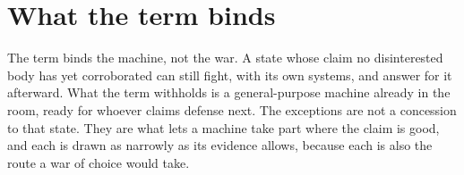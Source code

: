 \section{What the term binds}
\label{sec:6.9}
The term binds the machine, not the war. A state whose claim no disinterested body has yet corroborated can still fight, with its own systems, and answer for it afterward. What the term withholds is a general-purpose machine already in the room, ready for whoever claims defense next. The exceptions are not a concession to that state. They are what lets a machine take part where the claim is good, and each is drawn as narrowly as its evidence allows, because each is also the route a war of choice would take.
